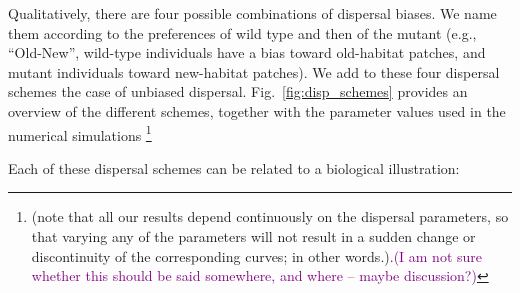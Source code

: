 \documentclass[11pt]{article}
\newcommand{\florence}[1]{\textcolor{purple}{(#1)}} %
\begin{document}
Qualitatively, there are four possible combinations of dispersal biases. We name them according to the preferences of wild type and then of the mutant (e.g., ``Old-New'', wild-type individuals have a bias toward old-habitat patches, and mutant individuals toward new-habitat patches). We add to these four dispersal schemes the case of unbiased dispersal. Fig.~\ref{fig:disp_schemes} provides an overview of the different schemes, together with the parameter values used in the numerical simulations \footnote{(note that all our results depend continuously on the dispersal parameters, so that varying any of the parameters will not result in a sudden change or discontinuity of the corresponding curves; in other words.).\florence{I am not sure whether this should be said somewhere, and where -- maybe discussion?}} 

Each of these dispersal schemes can be related to a biological illustration:
\end{document}
